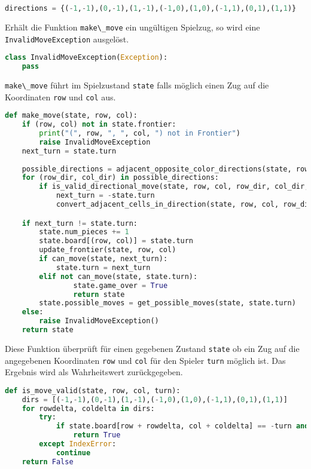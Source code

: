 \begin{lstlisting}[language=Python]
directions = {(-1,-1),(0,-1),(1,-1),(-1,0),(1,0),(-1,1),(0,1),(1,1)}
\end{lstlisting}

Erhält die Funktion \passthrough{\lstinline!make\_move!} ein ungültigen
Spielzug, so wird eine \passthrough{\lstinline!InvalidMoveException!}
ausgelöst.

\begin{lstlisting}[language=Python]
class InvalidMoveException(Exception):
    pass
\end{lstlisting}

\passthrough{\lstinline!make\_move!} führt im Spielzustand
\passthrough{\lstinline!state!} falls möglich einen Zug auf die
Koordinaten \passthrough{\lstinline!row!} und
\passthrough{\lstinline!col!} aus.

\begin{lstlisting}[language=Python]
def make_move(state, row, col):
    if (row, col) not in state.frontier:
        print("(", row, ", ", col, ") not in Frontier")
        raise InvalidMoveException
    next_turn = state.turn
        
    possible_directions = adjacent_opposite_color_directions(state, row, col, state.turn)
    for (row_dir, col_dir) in possible_directions:
        if is_valid_directional_move(state, row, col, row_dir, col_dir, state.turn):
            next_turn = -state.turn
            convert_adjacent_cells_in_direction(state, row, col, row_dir, col_dir, state.turn)

    if next_turn != state.turn:
        state.num_pieces += 1
        state.board[(row, col)] = state.turn
        update_frontier(state, row, col)
        if can_move(state, next_turn):
            state.turn = next_turn
        elif not can_move(state, state.turn):
                state.game_over = True
                return state
        state.possible_moves = get_possible_moves(state, state.turn)
    else:
        raise InvalidMoveException()
    return state
\end{lstlisting}

Diese Funktion überprüft für einen gegebenen Zustand
\passthrough{\lstinline!state!} ob ein Zug auf die angegebenen
Koordinaten \passthrough{\lstinline!row!} und
\passthrough{\lstinline!col!} für den Spieler
\passthrough{\lstinline!turn!} möglich ist. Das Ergebnis wird als
Wahrheitswert zurückgegeben.

\begin{lstlisting}[language=Python]
def is_move_valid(state, row, col, turn):
    dirs = [(-1,-1),(0,-1),(1,-1),(-1,0),(1,0),(-1,1),(0,1),(1,1)]
    for rowdelta, coldelta in dirs:
        try:
            if state.board[row + rowdelta, col + coldelta] == -turn and is_valid_directional_move(state, row, col, rowdelta, coldelta, turn):
                return True
        except IndexError:
            continue
    return False
\end{lstlisting}

